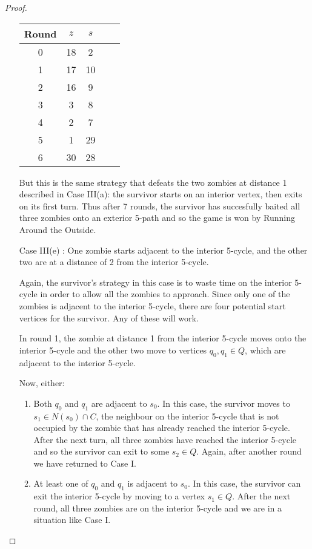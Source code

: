 \begin{proof}
\begin{enumerate}[I.]
\begin{tabular}{c | c | c | c | c }
Round & $z$ & $s$ \\
\hline
0 & 18 & 2 \\
1 & 17 & 10 \\
2 & 16 & 9 \\
3 & 3 & 8 \\
4 & 2 & 7 \\
5 & 1 & 29 \\
6 & 30 & 28
\end{tabular}

But this is the same strategy that defeats the two zombies at distance 1 described in Case III(a): the survivor starts on an interior vertex, then exits on its first turn.
Thus after 7 rounds, the survivor has succesfully baited all three zombies onto an exterior 5-path and so the game is won by Running Around the Outside.

\item[Case III(e)]: One zombie starts adjacent to the interior 5-cycle, and the other two are at a distance of 2 from the interior 5-cycle.

Again, the survivor's strategy in this case is to waste time on the interior 5-cycle in order to allow all the zombies to approach. Since only one of the
zombies is adjacent to the interior 5-cycle, there are four potential start vertices for the survivor. Any of these will work.

In round 1, the zombie at distance 1 from the interior 5-cycle moves onto the interior 5-cycle and the other two move to vertices $q_0, q_1 \in Q$,
which are adjacent to the interior 5-cycle.

Now, either:

\begin{enumerate}
\item Both $q_0$ and $q_1$ are adjacent to $s_0$. In this case, the survivor moves to $s_1 \in N(s_0) \cap C$, the neighbour on the interior 5-cycle that is not occupied
by the zombie that has already reached the interior 5-cycle. After the next turn, all three zombies have reached the interior 5-cycle and so the survivor can
exit to some $s_2 \in Q$. Again, after another round we have returned to Case I.

\item At least one of $q_0$ and $q_1$ is adjacent to $s_0$. In this case, the survivor can exit the interior 5-cycle by moving to a vertex $s_1 \in Q$. After the next
round, all three zombies are on the interior 5-cycle and we are in a situation like Case I.
\end{enumerate}


\end{enumerate}
\end{proof}
